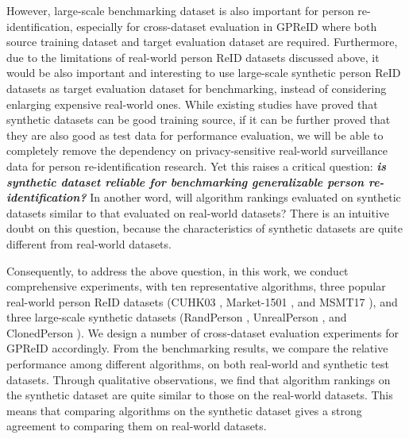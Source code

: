 \documentclass[10pt,twocolumn,letterpaper]{article}
\begin{document}
However, large-scale benchmarking dataset is also important for person re-identification, especially for cross-dataset evaluation in GPReID where both source training dataset and target evaluation dataset are required. Furthermore, due to the limitations of real-world person ReID datasets discussed above, it would be also important and interesting to use large-scale synthetic person ReID datasets as target evaluation dataset for benchmarking, instead of considering enlarging expensive real-world ones. While existing studies have proved that synthetic datasets can be good training source, if it can be further proved that they are also good as test data for performance evaluation, we will be able to completely remove the dependency on privacy-sensitive real-world surveillance data for person re-identification research. Yet this raises a critical question: \textbf{\textit{is synthetic dataset reliable for benchmarking generalizable person re-identification?}} In another word, will algorithm rankings evaluated on synthetic datasets similar to that evaluated on real-world datasets? There is an intuitive doubt on this question, because the characteristics of synthetic datasets are quite different from real-world datasets.

Consequently, to address the above question, in this work, we conduct comprehensive experiments, with ten representative algorithms, three popular real-world person ReID datasets (CUHK03 \cite{li2014deepreid}, Market-1501 \cite{zheng2015scalable}, and MSMT17 \cite{wei2018person}), and three large-scale synthetic datasets (RandPerson \cite{wang20rand}, UnrealPerson \cite{zhang2021unrealperson}, and ClonedPerson \cite{Wang-2022-Clonedperson}). We design a number of cross-dataset evaluation experiments for GPReID accordingly. From the benchmarking results, we compare the relative performance among different algorithms, on both real-world and synthetic test datasets. Through qualitative observations, we find that algorithm rankings on the synthetic dataset are quite similar to those on the real-world datasets. This means that comparing algorithms on the synthetic dataset gives a strong agreement to comparing them on real-world datasets. 
\end{document}
